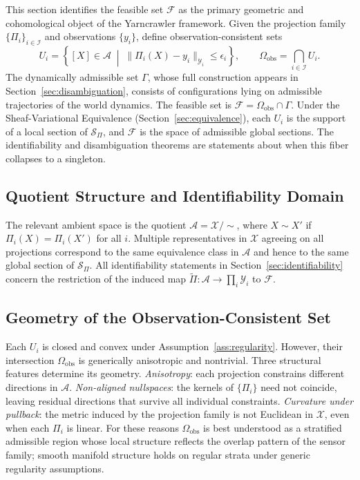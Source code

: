 \documentclass[11pt, oneside]{article}
\newcommand{\Ftil}{\widetilde{\Pi}}
\begin{document}
This section identifies the feasible set $\mathcal{F}$ as the primary geometric and
cohomological object of the Yarncrawler framework. Given the projection family
$\{\Pi_i\}_{i \in \mathcal{I}}$ and observations $\{y_i\}$, define
observation-consistent sets
\[
U_i = \left\{ [X] \in \mathcal{A} \;\middle|\;
\|\Pi_i(X) - y_i\|_{\mathcal{Y}_i} \le \epsilon_i \right\},
\qquad
\Omega_{\mathrm{obs}} = \bigcap_{i \in \mathcal{I}} U_i.
\]
The dynamically admissible set $\Gamma$, whose full construction appears in
Section~\ref{sec:disambiguation}, consists of configurations lying on admissible
trajectories of the world dynamics. The feasible set is
$\mathcal{F} = \Omega_{\mathrm{obs}} \cap \Gamma$.
Under the Sheaf-Variational Equivalence (Section~\ref{sec:equivalence}), each $U_i$
is the support of a local section of $\mathcal{S}_\Pi$, and $\mathcal{F}$ is the space
of admissible global sections. The identifiability and disambiguation theorems are
statements about when this fiber collapses to a singleton.

\subsection{Quotient Structure and Identifiability Domain}

The relevant ambient space is the quotient $\mathcal{A} = \mathcal{X}/{\sim}$, where
$X \sim X'$ if $\Pi_i(X) = \Pi_i(X')$ for all $i$. Multiple representatives in
$\mathcal{X}$ agreeing on all projections correspond to the same equivalence class in
$\mathcal{A}$ and hence to the same global section of $\mathcal{S}_\Pi$. All
identifiability statements in Section~\ref{sec:identifiability} concern the restriction
of the induced map $\Ftil : \mathcal{A} \to \prod_i \mathcal{Y}_i$ to $\mathcal{F}$.

\subsection{Geometry of the Observation-Consistent Set}

Each $U_i$ is closed and convex under Assumption~\ref{ass:regularity}. However, their
intersection $\Omega_{\mathrm{obs}}$ is generically anisotropic and nontrivial. Three
structural features determine its geometry. \emph{Anisotropy}: each projection
constrains different directions in $\mathcal{A}$. \emph{Non-aligned nullspaces}: the
kernels of $\{\Pi_i\}$ need not coincide, leaving residual directions that survive all
individual constraints. \emph{Curvature under pullback}: the metric induced by the
projection family is not Euclidean in $\mathcal{X}$, even when each $\Pi_i$ is linear.
For these reasons $\Omega_{\mathrm{obs}}$ is best understood as a stratified admissible
region whose local structure reflects the overlap pattern of the sensor family; smooth
manifold structure holds on regular strata under generic regularity assumptions.
\end{document}
